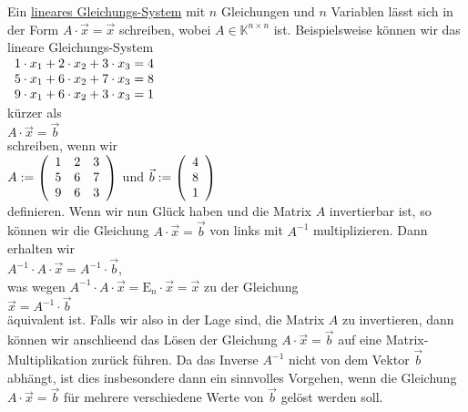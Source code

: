 \remark
Ein \href{https://de.wikipedia.org/wiki/Lineares_Gleichungssystem}{lineares Gleichungs-System} mit
$n$ Gleichungen und $n$ Variablen l\"{a}sst sich in der Form $A \cdot \vec{x} = \vec{x}$ schreiben, wobei $A \in \mathbb{K}^{n \times n}$ ist.
  Beispielsweise k\"{o}nnen wir das lineare Gleichungs-System
\\[0.2cm]
\hspace*{1.3cm}
$
\begin{array}[c]{lllcl}
  1 \cdot x_1 + 2 \cdot x_2 + 3 \cdot x_3 = 4 \\ 
  5 \cdot x_1 + 6 \cdot x_2 + 7 \cdot x_3 = 8 \\ 
  9 \cdot x_1 + 6 \cdot x_2 + 3 \cdot x_3 = 1 \\ 
\end{array}
$
\\[0.2cm]
k\"{u}rzer als
\\[0.2cm]
\hspace*{1.3cm}
$A \cdot \vec{x} = \vec{b}$
\\[0.2cm]
schreiben, wenn wir
\\[0.2cm]
\hspace*{1.3cm}
$A := \left(
  \begin{array}[c]{lll}
    1 & 2 & 3 \\
    5 & 6 & 7 \\
    9 & 6 & 3 \\
  \end{array}
  \right)
$ \quad und \quad
$\vec{b} := \left(
  \begin{array}[c]{l}
    4 \\
    8 \\
    1 \\
  \end{array}
  \right)
$
\\[0.2cm]
definieren.  Wenn wir nun Gl\"{u}ck haben und die Matrix $A$ invertierbar ist, so k\"{o}nnen wir die
Gleichung $A \cdot \vec{x} = \vec{b}$ von links mit $A^{-1}$ multiplizieren.  Dann erhalten wir
\\[0.2cm]
\hspace*{1.3cm}
$A^{-1} \cdot A \cdot \vec{x} = A^{-1} \cdot \vec{b}$,
\\[0.2cm]
was wegen $A^{-1} \cdot A \cdot \vec{x} = \mathrm{E}_n \cdot \vec{x} = \vec{x}$ zu der Gleichung
\\[0.2cm]
\hspace*{1.3cm}
$\vec{x} = A^{-1} \cdot \vec{b}$
\\[0.2cm]
\"{a}quivalent ist.  Falls wir also in der Lage sind, die Matrix $A$ zu invertieren,  dann k\"{o}nnen wir anschlie\3end
das L\"{o}sen der Gleichung $A \cdot \vec{x} = \vec{b}$  auf eine Matrix-Multiplikation zur\"{u}ck
f\"{u}hren.  Da das Inverse $A^{-1}$ nicht von dem Vektor $\vec{b}$ abh\"{a}ngt, ist dies insbesondere dann ein
sinnvolles Vorgehen, wenn die Gleichung $A \cdot \vec{x} = \vec{b}$ f\"{u}r mehrere verschiedene Werte von
$\vec{b}$ gel\"{o}st werden soll.  \eoxs

